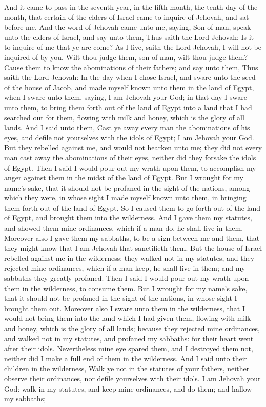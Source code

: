 And it came to pass in the seventh year, in the fifth month, the tenth day of the month, that certain of the elders of Israel came to inquire of Jehovah, and sat before me. And the word of Jehovah came unto me, saying, Son of man, speak unto the elders of Israel, and say unto them, Thus saith the Lord Jehovah: Is it to inquire of me that ye are come? As I live, saith the Lord Jehovah, I will not be inquired of by you. Wilt thou judge them, son of man, wilt thou judge them? Cause them to know the abominations of their fathers; and say unto them, Thus saith the Lord Jehovah: In the day when I chose Israel, and sware unto the seed of the house of Jacob, and made myself known unto them in the land of Egypt, when I sware unto them, saying, I am Jehovah your God; in that day I sware unto them, to bring them forth out of the land of Egypt into a land that I had searched out for them, flowing with milk and honey, which is the glory of all lands. And I said unto them, Cast ye away every man the abominations of his eyes, and defile not yourselves with the idols of Egypt; I am Jehovah your God. But they rebelled against me, and would not hearken unto me; they did not every man cast away the abominations of their eyes, neither did they forsake the idols of Egypt. Then I said I would pour out my wrath upon them, to accomplish my anger against them in the midst of the land of Egypt. But I wrought for my name’s sake, that it should not be profaned in the sight of the nations, among which they were, in whose sight I made myself known unto them, in bringing them forth out of the land of Egypt.  So I caused them to go forth out of the land of Egypt, and brought them into the wilderness. And I gave them my statutes, and showed them mine ordinances, which if a man do, he shall live in them. Moreover also I gave them my sabbaths, to be a sign between me and them, that they might know that I am Jehovah that sanctifieth them. But the house of Israel rebelled against me in the wilderness: they walked not in my statutes, and they rejected mine ordinances, which if a man keep, he shall live in them; and my sabbaths they greatly profaned. Then I said I would pour out my wrath upon them in the wilderness, to consume them. But I wrought for my name’s sake, that it should not be profaned in the sight of the nations, in whose sight I brought them out. Moreover also I sware unto them in the wilderness, that I would not bring them into the land which I had given them, flowing with milk and honey, which is the glory of all lands; because they rejected mine ordinances, and walked not in my statutes, and profaned my sabbaths: for their heart went after their idols. Nevertheless mine eye spared them, and I destroyed them not, neither did I make a full end of them in the wilderness.  And I said unto their children in the wilderness, Walk ye not in the statutes of your fathers, neither observe their ordinances, nor defile yourselves with their idols. I am Jehovah your God: walk in my statutes, and keep mine ordinances, and do them; and hallow my sabbaths; 